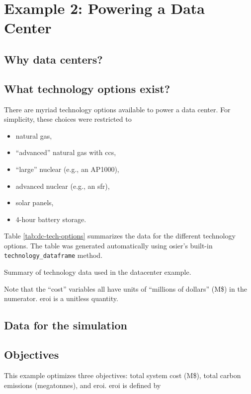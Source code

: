 \section{Example 2: Powering a Data Center}

\subsection{Why data centers?}

\subsection{What technology options exist?}
There are myriad technology options available to power a data center. For simplicity, these choices were restricted
to 
\begin{itemize}
    \item natural gas,
    \item ``advanced'' natural gas with \ac{ccs},
    \item ``large'' nuclear (e.g., an AP1000),
    \item advanced nuclear (e.g., an \ac{sfr}),
    \item solar panels,
    \item 4-hour battery storage.
\end{itemize}

Table \ref{tab:dc-tech-options} summarizes the data for the different technology options. The
table was generated automatically using \ac{osier}'s built-in \texttt{technology\_dataframe} method. 
\begin{table}[htpb!]
    \centering
    \caption{Summary of technology data used in the datacenter example.}
    \label{tab:dc-tech-options}
    \resizebox{\columnwidth}{!}{}
\end{table}

Note that the ``cost'' variables all have units of ``millions of dollars'' (M\$) in the numerator. \ac{eroi}
is a unitless quantity.
 
\FloatBarrier

\subsection{Data for the simulation}
\subsection{Objectives}
This example optimizes three objectives: total system cost (M\$), total carbon emissions (megatonnes), and \ac{eroi}.
\ac{eroi} is defined by 

